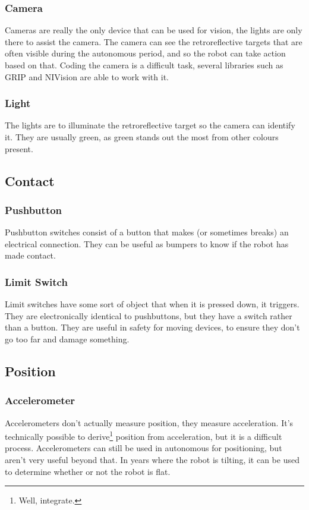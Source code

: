 \documentclass[]{report}
\begin{document}
\subsubsection{Camera}
		Cameras are really the only device that can be used for vision, the lights are only there to assist the camera.
		The camera can see the retroreflective targets that are often visible during the autonomous period, and so the robot can take action based on that.
		Coding the camera is a difficult task, several libraries such as GRIP and NIVision are able to work with it.
\subsubsection{Light}
		The lights are to illuminate the retroreflective target so the camera can identify it.
		They are usually green, as green stands out the most from other colours present.
\subsection{Contact}
	\subsubsection{Pushbutton}
		Pushbutton switches consist of a button that makes (or sometimes breaks) an electrical connection.
		They can be useful as bumpers to know if the robot has made contact.
	\subsubsection{Limit Switch}
		Limit switches have some sort of object that when it is pressed down, it triggers.
		They are electronically identical to pushbuttons, but they have a switch rather than a button.
		They are useful in safety for moving devices, to ensure they don't go too far and damage something.
\subsection{Position}
	\subsubsection{Accelerometer}
		Accelerometers don't actually measure position, they measure acceleration.
		It's technically possible to derive\footnote{Well, integrate.} position from acceleration, but it is a difficult process.
		Accelerometers can still be used in autonomous for positioning, but aren't very useful beyond that.
		In years where the robot is tilting, it can be used to determine whether or not the robot is flat.
		
\end{document}
